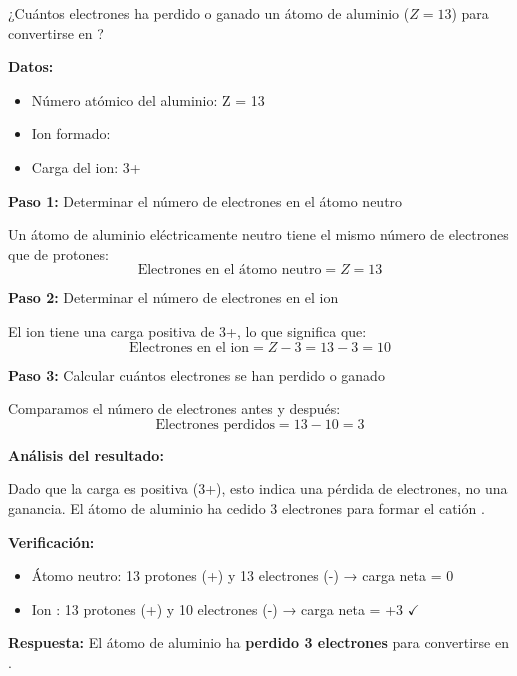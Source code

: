 \begin{exercise}
    ¿Cuántos electrones ha perdido o ganado un átomo de aluminio (\( Z = 13 \)) para convertirse en ?
    \begin{solu}
        \textbf{Datos:}
        \begin{itemize}
            \item Número atómico del aluminio: Z = 13
            \item Ion formado: 
            \item Carga del ion: 3+
        \end{itemize}

        \textbf{Paso 1:} Determinar el número de electrones en el átomo neutro

        Un átomo de aluminio eléctricamente neutro tiene el mismo número de electrones que de protones:
        \[
            \text{Electrones en el átomo neutro} = Z = 13
        \]

        \textbf{Paso 2:} Determinar el número de electrones en el ion

        El ion  tiene una carga positiva de 3+, lo que significa que:
        \[
            \text{Electrones en el ion} = Z - 3 = 13 - 3 = 10
        \]

        \textbf{Paso 3:} Calcular cuántos electrones se han perdido o ganado

        Comparamos el número de electrones antes y después:
        \[
            \text{Electrones perdidos} = 13 - 10 = 3
        \]

        \textbf{Análisis del resultado:}

        Dado que la carga es positiva (3+), esto indica una pérdida de electrones, no una ganancia. El átomo de aluminio ha cedido 3 electrones para formar el catión .

        \textbf{Verificación:}
        \begin{itemize}
            \item Átomo neutro: 13 protones (+) y 13 electrones (-) → carga neta = 0
            \item Ion : 13 protones (+) y 10 electrones (-) → carga neta = +3 \( \checkmark \)
        \end{itemize}

        \textbf{Respuesta:} El átomo de aluminio ha \textbf{perdido 3 electrones} para convertirse en .
    \end{solu}
\end{exercise}
